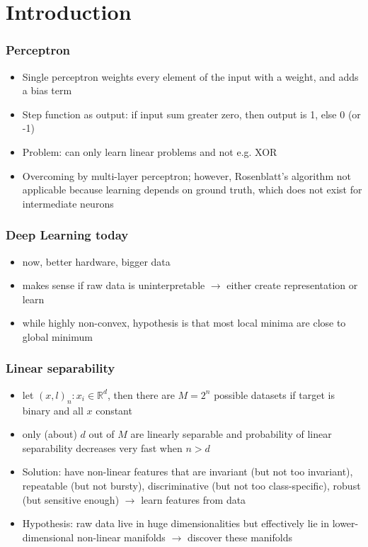 \section{Introduction}
\subsubsection{Perceptron}
\begin{itemize}
	\item Single perceptron weights every element of the input with a weight, and adds a bias term
	\item Step function as output: if input sum greater zero, then output is 1, else 0 (or -1)
	\item Problem: can only learn linear problems and not e.g. XOR
	\item Overcoming by multi-layer perceptron; however, Rosenblatt's algorithm not applicable because learning depends on ground truth, which does not exist for intermediate neurons
\end{itemize}
\subsubsection{Deep Learning today}
\begin{itemize}
	\item now, better hardware, bigger data
	\item makes sense if raw data is uninterpretable $\rightarrow$ either create representation or learn 
	\item while highly non-convex, hypothesis is that most local minima are close to global minimum
\end{itemize}
\subsubsection{Linear separability}
\begin{itemize}
	\item let $(x,l)_n : x_i \in \mathbb{R}^d$, then there are $M=2^n$ possible datasets if target is binary and all $x$ constant
	\item only (about) $d$ out of $M$ are linearly separable and probability of linear separability decreases very fast when $n>d$
	\item Solution: have non-linear features that are invariant (but not too invariant), repeatable (but not bursty), discriminative (but not too class-specific), robust (but sensitive enough) $\rightarrow$ learn features from data
	\item Hypothesis: raw data live in huge dimensionalities but effectively lie in lower-dimensional non-linear manifolds $\rightarrow$ discover these manifolds
\end{itemize}
